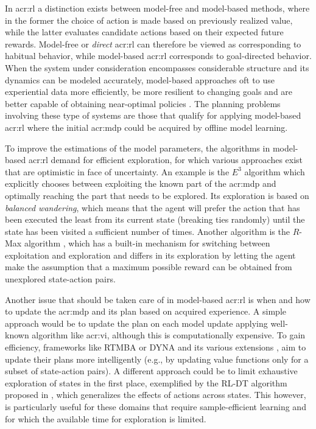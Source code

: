 In \acrshort{acr:rl} a distinction exists between model-free and model-based methods, where in the former the choice of action is made based on previously realized value, while the latter evaluates candidate actions based on their expected future rewards.
Model-free or \textit{direct} \acrshort{acr:rl} can therefore be viewed as corresponding to habitual behavior, while model-based \acrshort{acr:rl} corresponds to goal-directed behavior.
When the system under consideration encompasses considerable structure and its dynamics can be modeled accurately, model-based approaches oft to use experiential data more efficiently, be more resilient to changing goals and are better capable of obtaining near-optimal policies \cite{atkeson1997}.
The planning problems involving these type of systems are those that qualify for applying model-based \acrshort{acr:rl} where the initial \acrshort{acr:mdp} could be acquired by offline model learning.

To improve the estimations of the model parameters, the algorithms in model-based \acrshort{acr:rl} demand for efficient exploration, for which various approaches exist that are optimistic in face of uncertainty.
An example is the $E^3$ algorithm \cite{kearns2002near} which explicitly chooses between exploiting the known part of the \acrshort{acr:mdp} and optimally reaching the part that needs to be explored. 
Its exploration is based on \textit{balanced wandering}, which means that the agent will prefer the action that has been executed the least from its current state (breaking ties randomly) until the state has been visited a sufficient number of times.
Another algorithm is the $R$-Max algorithm \cite{Brafman2002}, which has a built-in mechanism for switching between exploitation and exploration and differs in its exploration by letting the agent make the assumption that a maximum possible reward can be obtained from unexplored state-action pairs.

Another issue that should be taken care of in model-based \acrshort{acr:rl} is when and how to update the \acrshort{acr:mdp} and its plan based on acquired experience. A simple approach would be to update the plan on each model update applying well-known algorithm like \acrshort{acr:vi}, although this is computationally expensive.
To gain efficiency, frameworks like \textsc{RTMBA} \cite{hester2012rtmba} or \textsc{DYNA} and its various extensions \cite{silver2008sample}, aim to update their plans more intelligently (e.g., by updating value functions only for a subset of state-action pairs).
A different approach could be to limit exhaustive exploration of states in the first place, exemplified by the \textsc{RL-DT} algorithm proposed in \cite{hester2010generalized}, which generalizes the effects of actions across states.
This however, is particularly useful for these domains that require sample-efficient learning and for which the available time for exploration is limited.

